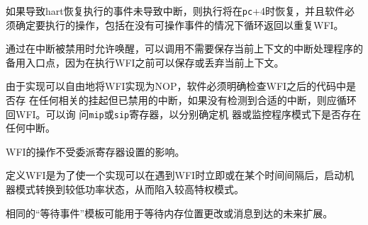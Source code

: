 {如果导致hart恢复执行的事件未导致中断，则执行将在{\tt pc}+4时恢复，并且软件必须确定要执行的操作，包括在没有可操作事件的情况下循环返回以重复WFI。

\iffalse
\begin{commentary}
By allowing wakeup when interrupts are disabled, an alternate entry
point to an interrupt handler can be called that does not require
saving the current context, as the current context can be saved or
discarded before the WFI is executed.

As implementations are free to implement WFI as a NOP, software must
explicitly check for any relevant pending but disabled interrupts in
the code following an WFI, and should loop back to the WFI if no
suitable interrupt was detected.  The {\tt mip} or {\tt sip}
registers can be interrogated to determine the presence
of any interrupt in machine or supervisor mode
respectively.

The operation of WFI is unaffected by the delegation register settings.

WFI is defined so that an implementation can trap into a higher
privilege mode, either immediately on encountering the WFI or after
some interval to initiate a machine-mode transition to a lower power
state, for example.
\end{commentary}
\fi
\begin{commentary}
通过在中断被禁用时允许唤醒，可以调用不需要保存当前上下文的中断处理程序的备用入口点，因为在执行WFI之前可以保存或丢弃当前上下文。

由于实现可以自由地将WFI实现为NOP，软件必须明确检查WFI之后的代码中是否存
在任何相关的挂起但已禁用的中断，如果没有检测到合适的中断，则应循环回WFI。可以询
问{\tt mip}或{\tt sip}寄存器，以分别确定机
器或监控程序模式下是否存在任何中断。

WFI的操作不受委派寄存器设置的影响。

定义WFI是为了使一个实现可以在遇到WFI时立即或在某个时间间隔后，启动机器模式转换到较低功率状态，从而陷入较高特权模式。
\end{commentary}

\iffalse
\begin{commentary}
The same ``wait-for-event'' template might be used for possible future
extensions that wait on memory locations changing, or message
arrival.
\end{commentary}
\fi
\begin{commentary}
相同的“等待事件”模板可能用于等待内存位置更改或消息到达的未来扩展。
\end{commentary}

}
